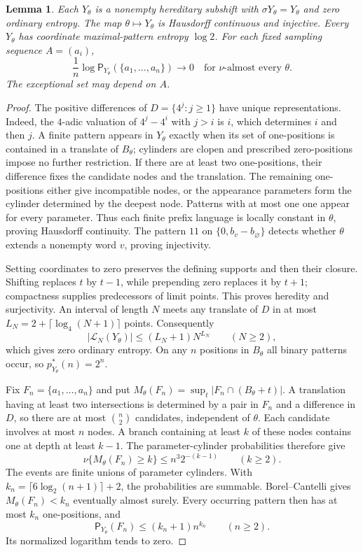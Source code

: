 \documentclass[11pt,reqno]{amsart}
\numberwithin{equation}{section}
\newtheorem{lemma}[theorem]{Lemma}
\theoremstyle{definition}
\newcommand{\Patt}{\mathsf P}
\begin{document}
\begin{lemma}\label{lem:sparse-bundle}
Each $Y_\theta$ is a nonempty hereditary subshift with
$\sigma Y_\theta=Y_\theta$ and zero ordinary entropy.
The map $\theta\mapsto Y_\theta$ is Hausdorff continuous and injective.
Every $Y_\theta$ has coordinate maximal-pattern entropy $\log2$.
For each fixed sampling sequence $A=(a_i)$,
\[
 \frac1n\log\Patt_{Y_\theta}(\{a_1,\ldots,a_n\})
 \longrightarrow0
 \quad\text{for }\nu\text{-almost every }\theta.
\]
The exceptional set may depend on $A$.
\end{lemma}
\begin{proof}
The positive differences of $D=\{4^j:j\ge1\}$ have unique
representations. Indeed, the $4$-adic valuation of
$4^j-4^i$ with $j>i$ is $i$, which determines $i$ and then $j$.
A finite pattern appears in $Y_\theta$ exactly when its set of
one-positions is contained in a translate of $B_\theta$;
cylinders are clopen and prescribed zero-positions impose no
further restriction. If there are at least two one-positions,
their difference fixes the candidate nodes and the translation.
The remaining one-positions either give incompatible nodes, or
the appearance parameters form the cylinder determined by the
deepest node. Patterns with at most one one appear for every
parameter. Thus each finite prefix language is locally constant
in $\theta$, proving Hausdorff continuity. The pattern $11$ on
$\{0,b_v-b_\varnothing\}$ detects whether $\theta$ extends a
nonempty word $v$, proving injectivity.

Setting coordinates to zero preserves the defining supports and
then their closure. Shifting replaces $t$ by $t-1$, while
prepending zero replaces it by $t+1$; compactness supplies
predecessors of limit points. This proves heredity and surjectivity.
An interval of length $N$ meets any translate of $D$ in at most
$L_N=2+\lceil\log_4(N+1)\rceil$ points. Consequently
\[
 |\mathcal L_N(Y_\theta)|
 \le (L_N+1)N^{L_N}\qquad(N\ge2),
\]
which gives zero ordinary entropy. On any $n$ positions in
$B_\theta$ all binary patterns occur, so $p_{Y_\theta}^*(n)=2^n$.

Fix $F_n=\{a_1,\ldots,a_n\}$ and put
$M_\theta(F_n)=\sup_t|F_n\cap(B_\theta+t)|$.
A translation having at least two intersections is determined
by a pair in $F_n$ and a difference in $D$, so there are at most
$\binom n2$ candidates, independent of $\theta$. Each candidate
involves at most $n$ nodes. A branch containing at least $k$
of these nodes contains one at depth at least $k-1$. The
parameter-cylinder probabilities therefore give
\[
 \nu\{M_\theta(F_n)\ge k\}\le n^3 2^{-(k-1)}
 \qquad(k\ge2).
\]
The events are finite unions of parameter cylinders. With
$k_n=\lceil6\log_2(n+1)\rceil+2$, the probabilities are summable.
Borel--Cantelli gives $M_\theta(F_n)<k_n$ eventually almost surely.
Every occurring pattern then has at most $k_n$ one-positions, and
\[
 \Patt_{Y_\theta}(F_n)\le(k_n+1)n^{k_n}\qquad(n\ge2).
\]
Its normalized logarithm tends to zero.
\end{proof}
\end{document}
